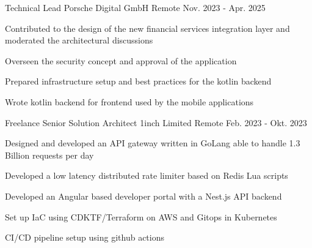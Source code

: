 
\begin{cventries}

  \cventry
    {Technical Lead} %
    {Porsche Digital GmbH} %
    {Remote} %
    {Nov. 2023 - Apr. 2025} %
    {
      \begin{cvitems} %
        \item {Contributed to the design of the new financial services integration layer and moderated the architectural discussions}
        \item {Overseen the security concept and approval of the application}
        \item {Prepared infrastructure setup and best practices for the kotlin backend}
        \item {Wrote kotlin backend for frontend used by the mobile applications}
      \end{cvitems}
    }

  \cventry
    {Freelance Senior Solution Architect} %
    {1inch Limited} %
    {Remote} %
    {Feb. 2023 - Okt. 2023} %
    {
      \begin{cvitems} %
        \item {Designed and developed an API gateway written in GoLang able to handle 1.3 Billion requests per day}
        \item {Developed a low latency distributed rate limiter based on Redis Lua scripts}
        \item {Developed an Angular based developer portal with a Nest.js API backend}
        \item {Set up IaC using CDKTF/Terraform on AWS and Gitops in Kubernetes}
        \item {CI/CD pipeline setup using github actions}
      \end{cvitems}
    }


\end{cventries}
